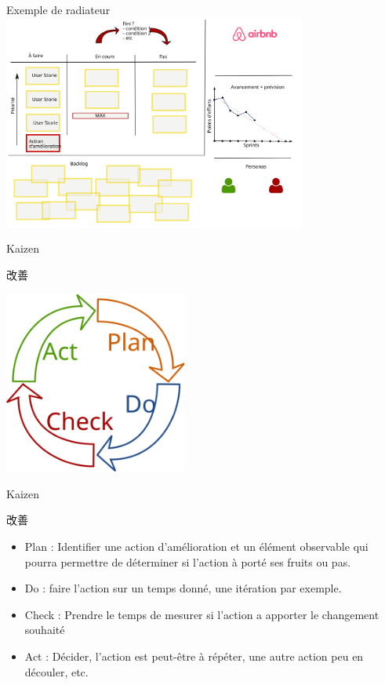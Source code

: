 \documentclass{beamer}
\begin{document}
\begin{frame}{Exemple de radiateur}
  \center
  \includegraphics[width=10cm]{includes/radiateur}
\end{frame}

\begin{frame}{Kaizen 
    {\begin{CJK*}{UTF8}{mj} 改善 \end{CJK*}}
  }
  \center
  \includegraphics[width=6cm]{includes/pdca}
\end{frame}

\begin{frame}{Kaizen 
    {\begin{CJK*}{UTF8}{mj} 改善 \end{CJK*}}
  }
  
  \begin{itemize}
    \item \alert{Plan} : Identifier une action d'amélioration et un élément observable qui pourra permettre de déterminer si l'action à porté ses fruits ou pas.
    \item \alert{Do} : faire l'action sur un temps donné, une itération par exemple.
    \item \alert{Check} : Prendre le temps de mesurer si l'action a apporter le changement souhaité
    \item \alert{Act} : Décider, l'action est peut-être à répéter, une autre action peu en découler, etc.
  \end{itemize}

\end{frame}
\end{document}
